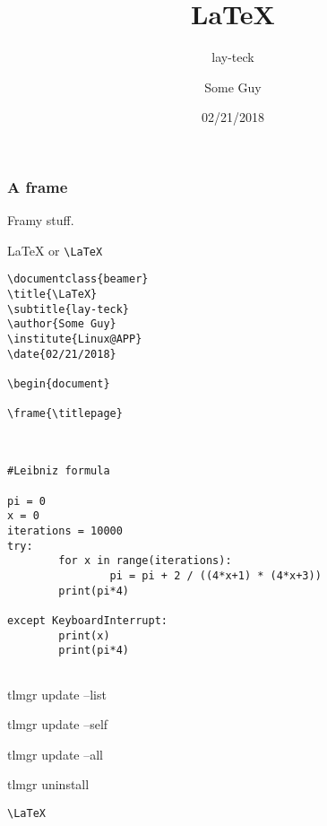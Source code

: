 \documentclass{beamer}
\title{\LaTeX}
\subtitle{lay-teck}
\author{Some Guy}
\institute{Linux@APP}
\date{02/21/2018}
\begin{document}
\frame{\titlepage}

\begin{frame}[fragile]
\frametitle{A frame}
Framy stuff.

{\LaTeX} or \verb|\LaTeX|
\begin{verbatim}
\documentclass{beamer}
\title{\LaTeX}
\subtitle{lay-teck}
\author{Some Guy}
\institute{Linux@APP}
\date{02/21/2018}

\begin{document}

\frame{\titlepage}


\end{verbatim}


\end{frame}

\begin{frame}[fragile]

\begin{verbatim}

#Leibniz formula

pi = 0
x = 0
iterations = 10000
try:
        for x in range(iterations):
                pi = pi + 2 / ((4*x+1) * (4*x+3))
        print(pi*4)

except KeyboardInterrupt:
        print(x)
        print(pi*4)


\end{verbatim}

\end{frame}

\begin{frame}

tlmgr update --list

tlmgr update --self

tlmgr update --all

tlmgr uninstall
\end{frame}

\begin{frame}[fragile]

\end{frame}

\begin{frame}[fragile]
\begin{verbatim}
\LaTeX
\end{verbatim}
\end{frame}
\end{document}
